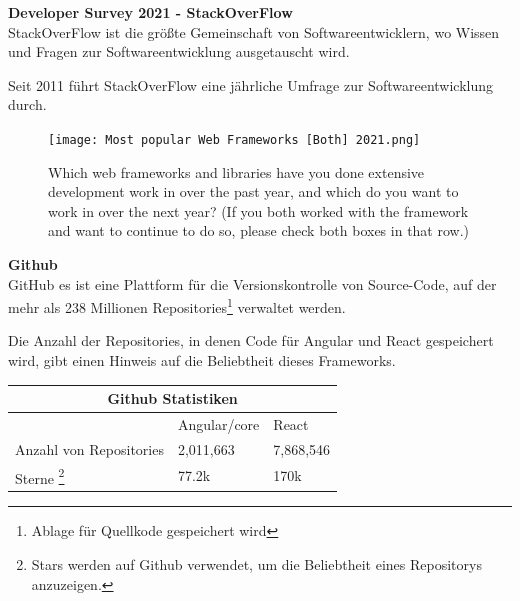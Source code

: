 \begin{flushleft}
  \textbf{Developer Survey 2021 - StackOverFlow}\\
  StackOverFlow ist die größte Gemeinschaft von Softwareentwicklern, wo Wissen und Fragen zur Softwareentwicklung ausgetauscht wird.

  Seit 2011 führt StackOverFlow eine jährliche Umfrage zur Softwareentwicklung durch.

  \begin{figure}[h]
    \centering
    \texttt{[image: Most popular Web Frameworks [Both] 2021.png]}
    \caption{ Which web frameworks and libraries have you done extensive development work in over the past year, and which do you want to work in over the next year? (If you both worked with the framework and want to continue to do so, please check both boxes in that row.) {\cite{SO01}}}

  \end{figure}
\end{flushleft}

\newpage

\begin{flushleft}
  \textbf{Github}\\
  GitHub es ist eine Plattform für die Versionskontrolle von Source-Code, auf der mehr als 238 Millionen Repositories\footnote{Ablage für Quellkode gespeichert wird} verwaltet werden{\cite{GH07}}.
\end{flushleft}

Die Anzahl der Repositories, in denen Code für Angular und React gespeichert wird, gibt einen Hinweis auf die Beliebtheit dieses Frameworks.
\\
\begin{table}[h!]
  \centering
  \begin{tabular}{ |p{5cm}||p{3.6cm}|p{3.6cm}|  }
    \hline
    \multicolumn{3}{|c|}{Github Statistiken}                                                                                                  \\
    \hline
                                                                                                                   & Angular/core & React     \\
    \hline
    Anzahl von     Repositories                                                                                    & 2,011,663    & 7,868,546
    \\

    \hline
    Sterne \footnote{Stars werden auf Github verwendet, um die Beliebtheit eines Repositorys anzuzeigen.} & 77.2k        & 170k
    \\
    \hline
  \end{tabular}
\end{table}

